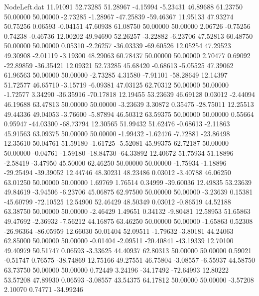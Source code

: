 \begin{filecontents}{NodeLeft.dat}
  11.91091   52.73285   51.28967    -4.15994   -5.23431   46.89688   61.23750   50.00000   50.00000   -2.73285   -1.28967  -47.25839  -59.46367
  11.95133   47.93274   50.75256     0.06593   -0.04151   47.60938   61.08750   50.00000   50.00000    2.06726   -0.75256    0.74238   -0.46736
  12.00202   49.94690   52.26257    -3.22882   -6.23706   47.52813   60.48750   50.00000   50.00000    0.05310   -2.26257  -36.03339  -69.60526
  12.05254   47.29523   49.30908    -2.01119   -3.19300   48.29063   60.78437   50.00000   50.00000    2.70477    0.69092  -22.89859  -36.35421
  12.09321   52.73285   45.68420    -0.68613   -5.05525   47.39062   61.96563   50.00000   50.00000   -2.73285    4.31580   -7.91101  -58.28649
  12.14397   51.72577   46.65710    -3.15719   -6.09381   47.03125   62.70312   50.00000   50.00000   -1.72577    3.34290  -36.35916  -70.17818
  12.19455   53.23639   46.69128     0.03012   -2.44094   46.19688   63.47813   50.00000   50.00000   -3.23639    3.30872    0.35475  -28.75011
  12.25513   49.44336   49.04053    -3.76600   -5.87894   46.50312   63.59375   50.00000   50.00000    0.55664    0.95947  -44.03300  -68.73794
  12.30565   51.99432   51.62476    -0.68613   -2.11863   45.91563   63.09375   50.00000   50.00000   -1.99432   -1.62476   -7.72881  -23.86498
  12.35610   50.04761   51.59180    -1.61725   -5.52081   45.99375   62.72187   50.00000   50.00000   -0.04761   -1.59180  -18.84730  -64.33892
  12.40672   51.75934   51.18896    -2.58419   -3.47950   45.50000   62.46250   50.00000   50.00000   -1.75934   -1.18896  -29.25494  -39.39052
  12.44746   48.30231   48.23486     0.03012   -3.40788   46.06250   63.01250   50.00000   50.00000    1.69769    1.76514    0.34999  -39.60036
  12.49835   53.23639   49.84619    -3.94506   -6.23706   45.06875   62.97500   50.00000   50.00000   -3.23639    0.15381  -45.60799  -72.10525
  12.54900   52.46429   48.50349     0.03012   -0.86519   44.52188   63.38750   50.00000   50.00000   -2.46429    1.49651    0.34132   -9.80481
  12.58953   51.65863   49.47692    -2.36932   -7.56212   44.16875   63.46250   50.00000   50.00000   -1.65863    0.52308  -26.96364  -86.05959
  12.66030   50.01404   52.09511    -1.79632   -3.80181   44.24063   62.85000   50.00000   50.00000   -0.01404   -2.09511  -20.40841  -43.19339
  12.70100   49.40979   50.51747     0.06593   -3.33625   44.40937   62.80313   50.00000   50.00000    0.59021   -0.51747    0.76575  -38.74869
  12.75166   49.27551   46.75804    -3.08557   -6.55937   44.58750   63.73750   50.00000   50.00000    0.72449    3.24196  -34.17492  -72.64993
  12.80222   53.57208   47.89930     0.06593   -3.08557   43.54375   64.17812   50.00000   50.00000   -3.57208    2.10070    0.74771  -34.99246

\end{filecontents}
